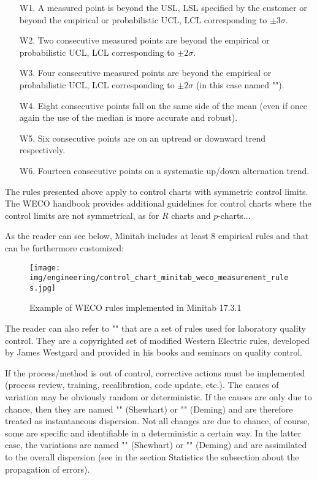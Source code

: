 	\pagebreak
	\begin{enumerate}
		\item[W1.] A measured point is beyond the USL, LSL specified by the customer or beyond the empirical or probabilistic UCL, LCL corresponding to $\pm 3\sigma$.

		\item[W2.] Two consecutive measured points are beyond the empirical or probabilistic UCL, LCL corresponding to $\pm 2\sigma$.

		\item[W3.] Four consecutive measured points are beyond the empirical or probabilistic UCL, LCL corresponding to $\pm 2\sigma$ (in this case named "").

		\item[W4.] Eight consecutive points fall on the same side of the mean (even if once again the use of the median is more accurate and robust).

		\item[W5.] Six consecutive points are on an uptrend or downward trend respectively.

		\item[W6.] Fourteen consecutive points on a systematic up/down alternation trend.
	\end{enumerate}
	The rules presented above apply to control charts with symmetric control limits. The WECO handbook provides additional guidelines for control charts where the control limits are not symmetrical, as for $R$ charts and $p$-charts...
	
	As the reader can see below, Minitab includes at least $8$ empirical rules and that can be furthermore customized:
	\begin{figure}[H]
		\centering
		\texttt{[image: img/engineering/control\_chart\_minitab\_weco\_measurement\_rules.jpg]}
		\caption[]{Example of WECO rules implemented in Minitab 17.3.1}
	\end{figure}
	\begin{tcolorbox}[title=Remark,colframe=black,arc=10pt]
	The reader can also refer to "" that are a set of rules used for laboratory quality control. They are a copyrighted set of modified Western Electric rules, developed by James Westgard and provided in his books and seminars on quality control.
	\end{tcolorbox}
	If the process/method is out of control, corrective actions must be implemented (process review, training, recalibration, code update, etc.). The causes of variation may be obviously random or deterministic. If the causes are only due to chance, then they are named "" (Shewhart) or "" (Deming) and are therefore treated as instantaneous dispersion. Not all changes are due to chance, of course, some are specific and identifiable in a deterministic a certain way. In the latter case, the variations are named "" (Shewhart) or "" (Deming) and are assimilated to the overall dispersion (see in the section Statistics the subsection about the propagation of errors). 

